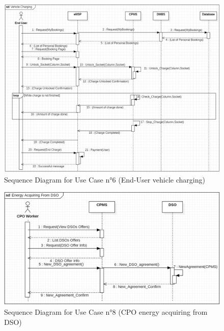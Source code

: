 \documentclass[a4paper]{report}
\begin{document}
\begin{figure}[p]
\includegraphics[width=\textwidth]{RASD/img/SD_ChargingVehicle_v2.png}
\caption{Sequence Diagram for Use Case n°6 (End-User vehicle charging)}
\label{fig:class-diagramRASD}
\end{figure}
\restoregeometry

\begin{figure}[p]
\includegraphics[width=\textwidth]{RASD/img/SD_EnergyAcquiringFromDSO_v2.png}
\caption{Sequence Diagram for Use Case n°8 (CPO energy acquiring from DSO)}
\label{fig:class-diagramRASD}
\end{figure}
\end{document}
